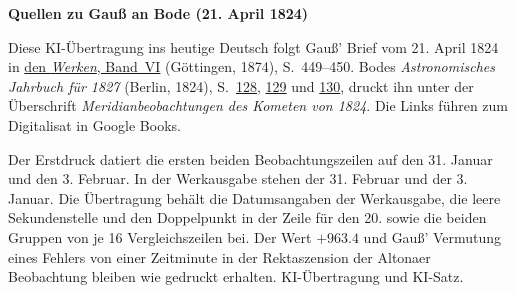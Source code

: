 \clearpage\thispagestyle{empty}
\begin{center}\textbf{Quellen zu Gauß an Bode (21. April 1824)}\end{center}
\noindent Diese KI-Übertragung ins heutige Deutsch folgt Gauß’ Brief vom 21. April 1824 in \href{https://gdz.sub.uni-goettingen.de/id/PPN236007467}{den \textit{Werken}, Band~VI} (Göttingen, 1874), S.~449--450. Bodes \textit{Astronomisches Jahrbuch für 1827} (Berlin, 1824), S.~\href{https://books.google.nl/books?id=4C8PAAAAQAAJ&pg=PA128&redir_esc=y}{128}, \href{https://books.google.nl/books?id=4C8PAAAAQAAJ&pg=PA129&redir_esc=y}{129} und \href{https://books.google.nl/books?id=4C8PAAAAQAAJ&pg=PA130&redir_esc=y}{130}, druckt ihn unter der Überschrift \textit{Meridianbeobachtungen des Kometen von 1824}. Die Links führen zum Digitalisat in Google Books.
\par\smallskip\noindent Der Erstdruck datiert die ersten beiden Beobachtungszeilen auf den 31. Januar und den 3. Februar. In der Werkausgabe stehen der 31. Februar und der 3. Januar. Die Übertragung behält die Datumsangaben der Werkausgabe, die leere Sekundenstelle und den Doppelpunkt in der Zeile für den 20. sowie die beiden Gruppen von je 16 Vergleichszeilen bei. Der Wert $+963.4$ und Gauß’ Vermutung eines Fehlers von einer Zeitminute in der Rektaszension der Altonaer Beobachtung bleiben wie gedruckt erhalten. KI-Übertragung und KI-Satz.
\clearpage
